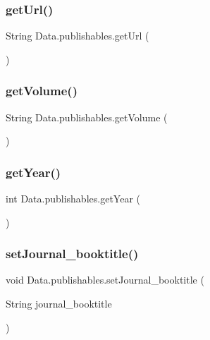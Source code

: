 \subsubsection{\texorpdfstring{get\+Url()}{getUrl()}}
{\footnotesize\ttfamily String Data.\+publishables.\+get\+Url (\begin{DoxyParamCaption}{ }\end{DoxyParamCaption})}

\hypertarget{class_data_1_1publishables_a6b3f36e7f557b5d3fc7c44d6975318a2}{}\label{class_data_1_1publishables_a6b3f36e7f557b5d3fc7c44d6975318a2} 
\subsubsection{\texorpdfstring{get\+Volume()}{getVolume()}}
{\footnotesize\ttfamily String Data.\+publishables.\+get\+Volume (\begin{DoxyParamCaption}{ }\end{DoxyParamCaption})}

\hypertarget{class_data_1_1publishables_a75f9f918753d279ce0eb81e4956931df}{}\label{class_data_1_1publishables_a75f9f918753d279ce0eb81e4956931df} 
\subsubsection{\texorpdfstring{get\+Year()}{getYear()}}
{\footnotesize\ttfamily int Data.\+publishables.\+get\+Year (\begin{DoxyParamCaption}{ }\end{DoxyParamCaption})}

\hypertarget{class_data_1_1publishables_a735b41a8df635fd719eae7927ed81329}{}\label{class_data_1_1publishables_a735b41a8df635fd719eae7927ed81329} 
\subsubsection{\texorpdfstring{set\+Journal\+\_\+booktitle()}{setJournal\_booktitle()}}
{\footnotesize\ttfamily void Data.\+publishables.\+set\+Journal\+\_\+booktitle (\begin{DoxyParamCaption}\item[{String}]{journal\+\_\+booktitle }\end{DoxyParamCaption})}


